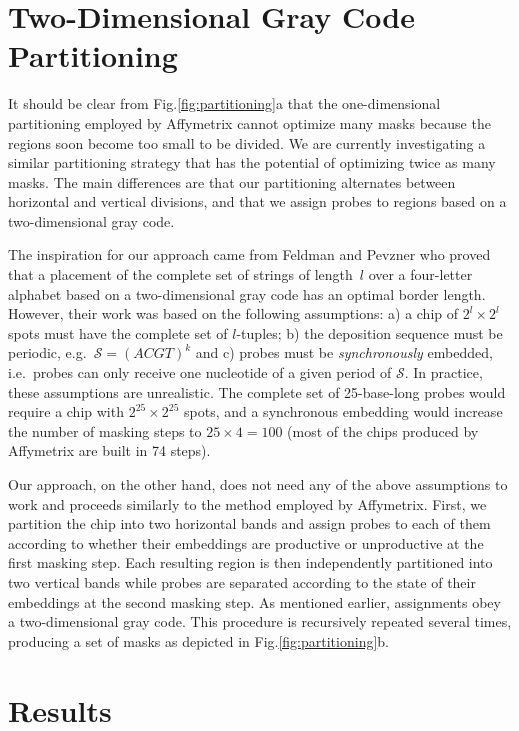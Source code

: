 \documentclass{llncs}
\begin{document}
\section{Two-Dimensional Gray Code Partitioning}

It should be clear from Fig.\ref{fig:partitioning}a that the one-dimensional partitioning employed by Affymetrix cannot optimize many masks because the regions soon become too small to be divided. We are currently investigating a similar partitioning strategy that has the potential of optimizing twice as many masks. The main differences are that our partitioning alternates between horizontal and vertical divisions, and that we assign probes to regions based on a two-dimensional gray code.

The inspiration for our approach came from Feldman and Pevzner \cite{FELDMAN93} who proved that a placement of the complete set of strings of length~$l$ over a four-letter alphabet based on a two-dimensional gray code has an optimal border length. However, their work was based on the following assumptions: a) a chip of $2^{l} \times 2^{l}$ spots must have the complete set of $l$-tuples; b) the deposition sequence must be periodic, e.g.\ $\mathcal{S} = (ACGT)^{k}$ and c) probes must be \emph{synchronously} embedded, i.e.\ probes can only receive one nucleotide of a given period of $\mathcal{S}$. In practice, these assumptions are unrealistic. The complete set of 25-base-long probes would require a chip with $2^{25} \times 2^{25}$ spots, and a synchronous embedding would increase the number of masking steps to $25 \times 4 = 100$ (most of the chips produced by Affymetrix are built in 74 steps).

Our approach, on the other hand, does not need any of the above assumptions to work and proceeds similarly to the method employed by Affymetrix. First, we partition the chip into two horizontal bands and assign probes to each of them according to whether their embeddings are productive or unproductive at the first masking step. Each resulting region is then independently partitioned into two vertical bands while probes are separated according to the state of their embeddings at the second masking step. As mentioned earlier, assignments obey a two-dimensional gray code. This procedure is recursively repeated several times, producing a set of masks as depicted in Fig.\ref{fig:partitioning}b.

\section{Results}
\end{document}
